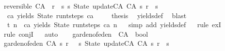 \begin{isabellebody}
{\isachardoublequoteopen}reversible\ {\isacharparenleft}CA\ {\isacharunderscore}\ r{\isacharparenright}\ {\isacharequal}\ {\isacharparenleft}{\isasymforall}s{\isachardot}\ {\isacharparenleft}{\isasymexists}{\isacharbang}s{}{\isachardot}\ State\ {\isacharparenleft}update{\isacharunderscore}CA\ {\isacharparenleft}CA\ s{}\ r{\isacharparenright}{\isacharparenright}\ {\isacharequal}\ s{\isacharparenright}{\isacharparenright}{\isachardoublequoteclose}\isanewline
\isanewline
{}\isamarkupfalse%
\ {\isachardoublequoteopen}ca\ yields\ State\ {\isacharparenleft}run{\isacharunderscore}t{\isacharunderscore}steps\ ca\ {}{\isacharparenright}{\isachardoublequoteclose}\isanewline
%
\isadelimproof
%
\endisadelimproof
%
\isatagproof
{}\isamarkupfalse%
{\isacharminus}\isanewline
\ \ \isamarkupfalse%
\ {\isacharquery}thesis\ \isamarkupfalse%
\ yields{\isacharunderscore}def\ \isamarkupfalse%
\ blast\isanewline
{}\isamarkupfalse%
%
\endisatagproof
{\isafoldproof}%
%
\isadelimproof
\isanewline
%
\endisadelimproof
\isanewline
{}\isamarkupfalse%
\ t{}\ {\isacharcolon}{\isachardoublequoteopen}n{\isachargreater}{}\ {\isasymLongrightarrow}\ ca\ yields\ State\ {\isacharparenleft}run{\isacharunderscore}t{\isacharunderscore}steps\ ca\ n{\isacharparenright}{\isachardoublequoteclose}\isanewline
%
\isadelimproof
\ \ %
\endisadelimproof
%
\isatagproof
{}\isamarkupfalse%
{\isacharparenleft}simp\ add{\isacharcolon}\ yields{\isacharunderscore}def{\isacharparenright}\isanewline
\ \ \isamarkupfalse%
{\isacharparenleft}rule\ exI{\isacharparenright}\isanewline
\ \ \isamarkupfalse%
{\isacharparenleft}rule\ conjI{\isacharparenright}\isanewline
\ \ \isamarkupfalse%
{\isacharparenleft}auto{\isacharparenright}\isanewline
\ \ \isamarkupfalse%
%
\endisatagproof
{\isafoldproof}%
%
\isadelimproof
\isanewline
%
\endisadelimproof
\isanewline
\isanewline
\isanewline
{}\isamarkupfalse%
\ garden{\isacharunderscore}of{\isacharunderscore}eden\ {\isacharcolon}{\isacharcolon}\ {\isachardoublequoteopen}CA\ {\isasymRightarrow}\ bool{\isachardoublequoteclose}\ \isanewline
{\isachardoublequoteopen}garden{\isacharunderscore}of{\isacharunderscore}eden\ {\isacharparenleft}CA\ s\ r{\isacharparenright}\ {\isacharequal}\ {\isacharparenleft}{\isasymnot}{\isacharparenleft}{\isasymexists}\ s{}{\isachardot}\ State\ {\isacharparenleft}update{\isacharunderscore}CA\ {\isacharparenleft}CA\ s{}\ r{\isacharparenright}{\isacharparenright}\ {\isacharequal}\ s{\isacharparenright}{\isacharparenright}{\isachardoublequoteclose}\isanewline

\end{isabellebody}
